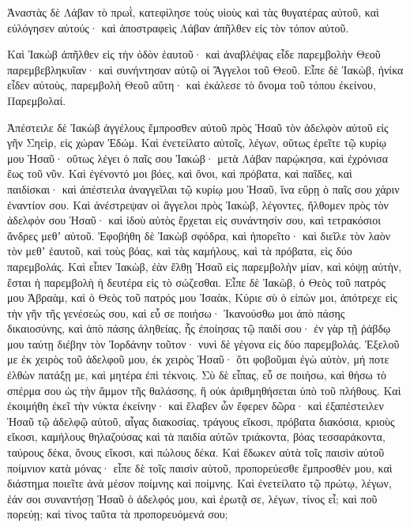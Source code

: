 {Ἀναστὰς δὲ Λάβαν τὸ πρωῒ, κατεφίλησε τοὺς υἱοὺς καὶ τὰς θυγατέρας αὐτοῦ, καὶ εὐλόγησεν αὐτούς· καὶ ἀποστραφεὶς Λάβαν ἀπῆλθεν εἰς τὸν τόπον αὐτοῦ.
\par }{\PP {}Καὶ Ἰακὼβ ἀπῆλθεν εἰς τὴν ὁδὸν ἑαυτοῦ· καὶ ἀναβλέψας εἶδε παρεμβολὴν Θεοῦ παρεμβεβληκυῖαν· καὶ συνήντησαν αὐτῷ οἱ Ἄγγελοι τοῦ Θεοῦ.
Εἶπε δὲ Ἰακὼβ, ἡνίκα εἶδεν αὐτοὺς, παρεμβολὴ Θεοῦ αὕτη· καὶ ἐκάλεσε τὸ ὄνομα τοῦ τόπου ἐκείνου, Παρεμβολαί.
\par }{\PP {}Ἀπέστειλε δὲ Ἰακὼβ ἀγγέλους ἔμπροσθεν αὐτοῦ πρὸς Ἡσαῦ τὸν ἀδελφὸν αὐτοῦ εἰς γῆν Σηεὶρ, εἰς χώραν Ἐδώμ.
Καὶ ἐνετείλατο αὐτοῖς, λέγων, οὕτως ἐρεῖτε τῷ κυρίῳ μου Ἡσαῦ· οὕτως λέγει ὁ παῖς σου Ἰακώβ· μετὰ Λάβαν παρῴκησα, καὶ ἐχρόνισα ἕως τοῦ νῦν.
Καὶ ἐγένοντό μοι βόες, καὶ ὄνοι, καὶ πρόβατα, καὶ παῖδες, καὶ παιδίσκαι· καὶ ἀπέστειλα ἀναγγεῖλαι τῷ κυρίῳ μου Ἡσαῦ, ἵνα εὕρῃ ὁ παῖς σου χάριν ἐναντίον σου.
Καὶ ἀνέστρεψαν οἱ ἄγγελοι πρὸς Ἰακὼβ, λέγοντες, ἤλθομεν πρὸς τὸν ἀδελφόν σου Ἡσαῦ· καὶ ἰδοὺ αὐτὸς ἔρχεται εἰς συνάντησίν σου, καὶ τετρακόσιοι ἄνδρες μεθʼ αὐτοῦ.
Ἐφοβήθη δὲ Ἰακὼβ σφόδρα, καὶ ἠπορεῖτο· καὶ διεῖλε τὸν λαὸν τὸν μεθʼ ἑαυτοῦ, καὶ τοὺς βόας, καὶ τὰς καμήλους, καὶ τὰ πρόβατα, εἰς δύο παρεμβολάς.
Καὶ εἶπεν Ἰακὼβ, ἐὰν ἔλθῃ Ἡσαῦ εἰς παρεμβολὴν μίαν, καὶ κόψῃ αὐτὴν, ἔσται ἡ παρεμβολὴ ἡ δευτέρα εἰς τὸ σώζεσθαι.
Εἶπε δὲ Ἰακὼβ, ὁ Θεὸς τοῦ πατρός μου Ἁβραὰμ, καὶ ὁ Θεὸς τοῦ πατρός μου Ἰσαὰκ, Κύριε σὺ ὁ εἰπών μοι, ἀπότρεχε εἰς τὴν γῆν τῆς γενέσεώς σου, καὶ εὖ σε ποιήσω·
Ἱκανούσθω μοι ἀπὸ πάσης δικαιοσύνης, καὶ ἀπὸ πάσης ἀληθείας, ἧς ἐποίησας τῷ παιδί σου· ἐν γὰρ τῇ ῥάβδῳ μου ταύτῃ διέβην τὸν Ἰορδάνην τοῦτον· νυνὶ δὲ γέγονα εἰς δύο παρεμβολάς.
Ἐξελοῦ με ἐκ χειρὸς τοῦ ἀδελφοῦ μου, ἐκ χειρὸς Ἡσαῦ· ὅτι φοβοῦμαι ἐγὼ αὐτὸν, μή ποτε ἐλθὼν πατάξῃ με, καὶ μητέρα ἐπὶ τέκνοις.
Σὺ δὲ εἶπας, εὖ σε ποιήσω, καὶ θήσω τὸ σπέρμα σου ὡς τὴν ἄμμον τῆς θαλάσσης, ἣ οὐκ ἀριθμηθήσεται ὑπὸ τοῦ πλήθους.
Καὶ ἐκοιμήθη ἐκεῖ τὴν νύκτα ἐκείνην· καὶ ἔλαβεν ὧν ἔφερεν δῶρα· καὶ ἐξαπέστειλεν Ἡσαῦ τῷ ἀδελφῷ αὐτοῦ,
αἶγας διακοσίας, τράγους εἴκοσι, πρόβατα διακόσια, κριοὺς εἴκοσι,
καμήλους θηλαζούσας καὶ τὰ παιδία αὐτῶν τριάκοντα, βόας τεσσαράκοντα, ταύρους δέκα, ὄνους εἴκοσι, καὶ πώλους δέκα.
Καὶ ἔδωκεν αὐτὰ τοῖς παισὶν αὐτοῦ ποίμνιον κατὰ μόνας· εἶπε δὲ τοῖς παισὶν αὐτοῦ, προπορεύεσθε ἔμπροσθέν μου, καὶ διάστημα ποιεῖτε ἀνὰ μέσον ποίμνης καὶ ποίμνης.
Καὶ ἐνετείλατο τῷ πρώτῳ, λέγων, ἐάν σοι συναντήσῃ Ἡσαῦ ὁ ἀδελφός μου, καὶ ἐρωτᾷ σε, λέγων, τίνος εἶ; καὶ ποῦ πορεύῃ; καὶ τίνος ταῦτα τὰ προπορευόμενά σου;
}
